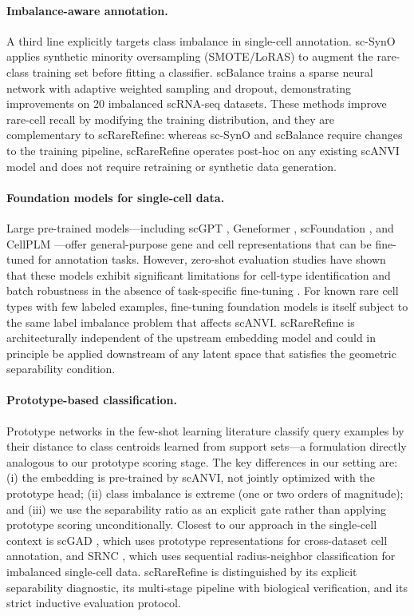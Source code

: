 \paragraph{Imbalance-aware annotation.}
A third line explicitly targets class imbalance in single-cell annotation. sc-SynO \citep{mulvey2021scsyno} applies synthetic minority oversampling (SMOTE/LoRAS) to augment the rare-class training set before fitting a classifier. scBalance \citep{xu2023scbalance} trains a sparse neural network with adaptive weighted sampling and dropout, demonstrating improvements on 20 imbalanced scRNA-seq datasets. These methods improve rare-cell recall by modifying the training distribution, and they are complementary to scRareRefine: whereas sc-SynO and scBalance require changes to the training pipeline, scRareRefine operates post-hoc on any existing scANVI model and does not require retraining or synthetic data generation.

\paragraph{Foundation models for single-cell data.}
Large pre-trained models---including scGPT \citep{cui2024scgpt}, Geneformer \citep{theodoris2023transfer}, scFoundation \citep{hao2024large}, and CellPLM \citep{wen2023cellplm}---offer general-purpose gene and cell representations that can be fine-tuned for annotation tasks. However, zero-shot evaluation studies have shown that these models exhibit significant limitations for cell-type identification and batch robustness in the absence of task-specific fine-tuning \citep{heimberg2025zeroshot,schmidt2024evaluating}. For known rare cell types with few labeled examples, fine-tuning foundation models is itself subject to the same label imbalance problem that affects scANVI. scRareRefine is architecturally independent of the upstream embedding model and could in principle be applied downstream of any latent space that satisfies the geometric separability condition.

\paragraph{Prototype-based classification.}
Prototype networks \citep{snell2017prototypical} in the few-shot learning literature classify query examples by their distance to class centroids learned from support sets---a formulation directly analogous to our prototype scoring stage. The key differences in our setting are: (i) the embedding is pre-trained by scANVI, not jointly optimized with the prototype head; (ii) class imbalance is extreme (one or two orders of magnitude); and (iii) we use the separability ratio as an explicit gate rather than applying prototype scoring unconditionally. Closest to our approach in the single-cell context is scGAD \citep{li2022scgad}, which uses prototype representations for cross-dataset cell annotation, and SRNC \citep{li2026srnc}, which uses sequential radius-neighbor classification for imbalanced single-cell data. scRareRefine is distinguished by its explicit separability diagnostic, its multi-stage pipeline with biological verification, and its strict inductive evaluation protocol.
